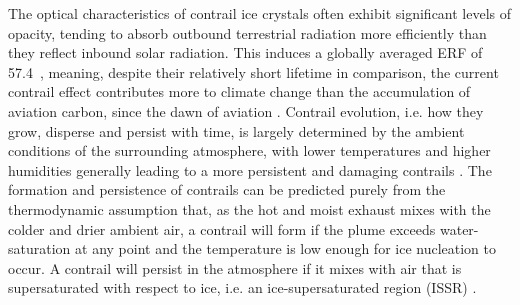 The optical characteristics of contrail ice crystals often exhibit significant levels of opacity, tending to absorb outbound terrestrial radiation more efficiently than they reflect inbound solar radiation. This induces a globally averaged ERF of 57.4~, meaning, despite their relatively short lifetime in comparison, the current contrail effect contributes more to climate change than the accumulation of aviation carbon, since the dawn of aviation \cite{Burkhardt2011}. Contrail evolution, i.e. how they grow, disperse and persist with time, is largely determined by the ambient conditions of the surrounding atmosphere, with lower temperatures and higher humidities generally leading to a more persistent and damaging contrails \cite{Schumann2005}. The formation and persistence of contrails can be predicted purely from the thermodynamic assumption that, as the hot and moist exhaust mixes with the colder and drier ambient air, a contrail will form if the plume exceeds water-saturation at any point and the temperature is low enough for ice nucleation to occur. A contrail will persist in the atmosphere if it mixes with air that is supersaturated with respect to ice, i.e. an ice-supersaturated region (ISSR) \cite{Karcher2018}. 


